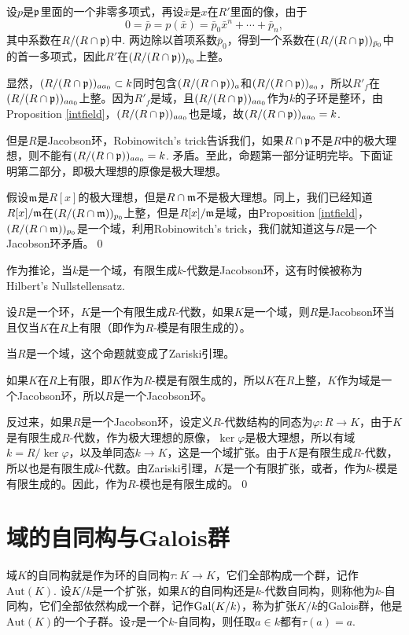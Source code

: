 设$p$是$\mathfrak{p}$里面的一个非零多项式，再设$\bar{x}$是$x$在$R'$里面的像，由于
\[
	0=\bar{p}=p(\bar{x})=\bar{p}_0\bar{x}^n+\cdots+\bar{p}_n,
\]
其中系数在$R/(R\cap \mathfrak{p})$中. 两边除以首项系数$\bar{p}_0$，得到一个系数在$(R/(R\cap \mathfrak{p}))_{\bar{p}_0}$中的首一多项式，因此$R'$在$(R/(R\cap \mathfrak{p}))_{p_0}$上整。

显然，$(R/(R\cap \mathfrak{p}))_{aa_0}\subset k$同时包含$(R/(R\cap \mathfrak{p}))_{a}$和$(R/(R\cap \mathfrak{p}))_{a_0}$，所以$R'_f$在$(R/(R\cap \mathfrak{p}))_{aa_0}$上整。因为$R'_f$是域，且$(R/(R\cap \mathfrak{p}))_{aa_0}$作为$k$的子环是整环，由Proposition \eqref{intfield}，$(R/(R\cap \mathfrak{p}))_{aa_0}$也是域，故$(R/(R\cap \mathfrak{p}))_{aa_0}=k$.

但是$R$是Jacobson环，Robinowitch's trick告诉我们，如果$R\cap \mathfrak{p}$不是$R$中的极大理想，则不能有$(R/(R\cap \mathfrak{p}))_{aa_0}=k$. 矛盾。至此，命题第一部分证明完毕。下面证明第二部分，即极大理想的原像是极大理想。

假设$\mathfrak{m}$是$R[x]$的极大理想，但是$R\cap \mathfrak{m}$不是极大理想。同上，我们已经知道$R[x]/\mathfrak{m}$在$(R/(R\cap \mathfrak{m}))_{p_0}$上整，但是$R[x]/\mathfrak{m}$是域，由Proposition \eqref{intfield}，$(R/(R\cap \mathfrak{m}))_{p_0}$是一个域，利用Robinowitch's trick，我们就知道这与$R$是一个Jacobson环矛盾。\qed

作为推论，当$k$是一个域，有限生成$k$-代数是Jacobson环，这有时候被称为Hilbert's Nullstellensatz.

\pro 设$R$是一个环，$K$是一个有限生成$R$-代数，如果$K$是一个域，则$R$是Jacobson环当且仅当$K$在$R$上有限（即作为$R$-模是有限生成的）。

当$R$是一个域，这个命题就变成了Zariski引理。

\proof 如果$K$在$R$上有限，即$K$作为$R$-模是有限生成的，所以$K$在$R$上整，$K$作为域是一个Jacobson环，所以$R$是一个Jacobson环。

反过来，如果$R$是一个Jacobson环，设定义$R$-代数结构的同态为$\varphi:R\to K$，由于$K$是有限生成$R$-代数，作为极大理想的原像，$\ker\varphi$是极大理想，所以有域$k=R/\ker\varphi$，以及单同态$k\to K$，这是一个域扩张。由于$K$是有限生成$R$-代数，所以也是有限生成$k$-代数。由Zariski引理，$K$是一个有限扩张，或者，作为$k$-模是有限生成的。因此，作为$R$-模也是有限生成的。\qed

\section{域的自同构与Galois群}

\para 域$K$的自同构就是作为环的自同构$\tau:K\to K$，它们全部构成一个群，记作$\mathrm{Aut}(K)$. 设$K/k$是一个扩张，如果$K$的自同构还是$k$-代数自同构，则称他为$k$-自同构，它们全部依然构成一个群，记作$\operatorname{Gal}(K/k)$，称为扩张$K/k$的Galois群，他是$\mathrm{Aut}(K)$的一个子群。设$\tau$是一个$k$-自同构，则任取$a\in k$都有$\tau(a)=a$.

